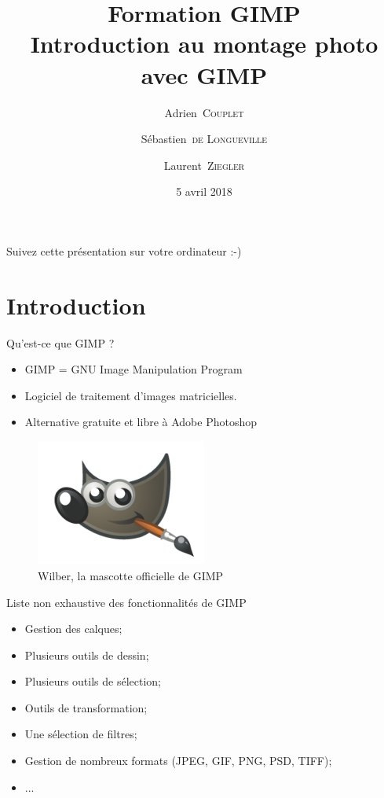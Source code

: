 \documentclass[10pt,svgnames,usenames,table]{beamer}
\institute{Louvain-li-Nux}
\title{\textbf{Formation GIMP}\\
Introduction au montage photo avec GIMP}
\author{Adrien~\textsc{Couplet} \and Sébastien~\textsc{de Longueville} \and Laurent~\textsc{Ziegler}}
\date{5 avril 2018}
\begin{document}
\begin{frame}
	\maketitle
\end{frame}

\begin{frame}
  \begin{center}\Large
  Suivez cette présentation sur votre ordinateur :-)
  
  \vspace{1cm}
  \end{center}
\end{frame}

\section{Introduction}
\begin{frame}[allowframebreaks]{Qu'est-ce que GIMP ?}
    \begin{itemize}
        \item GIMP = GNU Image Manipulation Program
        \item Logiciel de traitement d'images matricielles.
        \item Alternative gratuite et libre à Adobe Photoshop
    \end{itemize}
    \begin{figure}
        \centering
        \includegraphics[width=0.5\textwidth]{Images/gimp-logo}
        \caption{Wilber, la mascotte officielle de GIMP} 
    \end{figure}
    \framebreak
    Liste non exhaustive des fonctionnalités de GIMP
    \begin{itemize}
        \item Gestion des calques;
        \item Plusieurs outils de dessin;
        \item Plusieurs outils de sélection;
        \item Outils de transformation;
        \item Une sélection de filtres;
        \item Gestion de nombreux formats (JPEG, GIF, PNG, PSD, TIFF);
        \item ...
    \end{itemize}
\end{frame}
\end{document}
